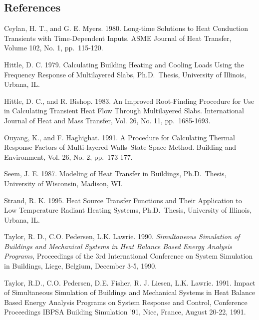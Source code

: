 \subsection{References}\label{references-043}

Ceylan, H. T., and G. E. Myers. 1980. Long-time Solutions to Heat Conduction Transients with Time-Dependent Inputs. ASME Journal of Heat Transfer, Volume 102, No. 1, pp.~115-120.

Hittle, D. C. 1979. Calculating Building Heating and Cooling Loads Using the Frequency Response of Multilayered Slabs, Ph.D.~Thesis, University of Illinois, Urbana, IL.

Hittle, D. C., and R. Bishop. 1983. An Improved Root-Finding Procedure for Use in Calculating Transient Heat Flow Through Multilayered Slabs. International Journal of Heat and Mass Transfer, Vol. 26, No. 11, pp.~1685-1693.

Ouyang, K., and F. Haghighat. 1991. A Procedure for Calculating Thermal Response Factors of Multi-layered Walls--State Space Method. Building and Environment, Vol. 26, No. 2, pp.~173-177.

Seem, J. E. 1987. Modeling of Heat Transfer in Buildings, Ph.D.~Thesis, University of Wisconsin, Madison, WI.

Strand, R. K. 1995. Heat Source Transfer Functions and Their Application to Low Temperature Radiant Heating Systems, Ph.D.~Thesis, University of Illinois, Urbana, IL.

Taylor, R. D., C.O. Pedersen, L.K. Lawrie. 1990. \emph{Simultaneous Simulation of Buildings and Mechanical Systems in Heat Balance Based Energy Analysis Programs}, Proceedings of the 3rd International Conference on System Simulation in Buildings, Liege, Belgium, December 3-5, 1990.

Taylor, R.D., C.O. Pedersen, D.E. Fisher, R. J. Liesen, L.K. Lawrie. 1991. Impact of Simultaneous Simulation of Buildings and Mechanical Systems in Heat Balance Based Energy Analysis Programs on System Response and Control, Conference Proceedings IBPSA Building Simulation '91, Nice, France, August 20-22, 1991.
